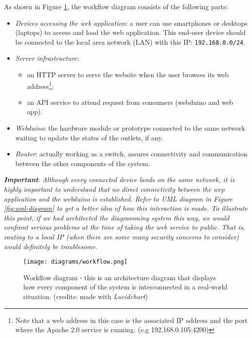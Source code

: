As shown in Figure \ref{fig:workflow-diagram}, the workflow diagram consists of the following parts:
\begin{itemize}
    \item \textit{Devices accessing the web application}: a user can use smartphones or desktops (laptops) to access and load the web application. This end-user device should be connected to the local area network (LAN) with this IP: \texttt{192.168.0.0/24}.
    \item \textit{Server infrastructure}:
    \begin{itemize}
        \item an HTTP server to serve the website when the user browses its web address\footnote{Note that a web address in this case is the associated IP address and the port where the Apache 2.0 service is running. (e.g 192.168.0.105:4200)};
        \item an API service to attend request from consumers (webduino and web app).
    \end{itemize}
    \item \textit{Webduino}: the hardware module or prototype connected to the same network waiting to update the states of the outlets, if any.
    \item \textit{Router}: actually working as a switch, assures connectivity and communication between the other components of the system.
\end{itemize}

\textbf{\textit{Important}}: \textit{Although every connected device lands on the same network, it is highly important to understand that no direct connectivity between the wep application and the webduino is established. Refer to UML diagram in Figure \ref{fig:uml-diagram} to get a better idea of how this interaction is made. To illustrate this point, if we had architected the diagramming system this way, we would confront serious problems at the time of taking the web service to public. That is, routing to a local IP (when there are some many security concerns to consider) would definitely be troublesome.}

\begin{figure}[ht!]
    \centering
    \texttt{[image: diagrams/workflow.png]}
    \caption{Workflow diagram - this is an architecture diagram that displays how every component of the system is interconnected in a real-world situation. (credits: made with \emph{Lucidchart})}
    \label{fig:workflow-diagram}
\end{figure}

